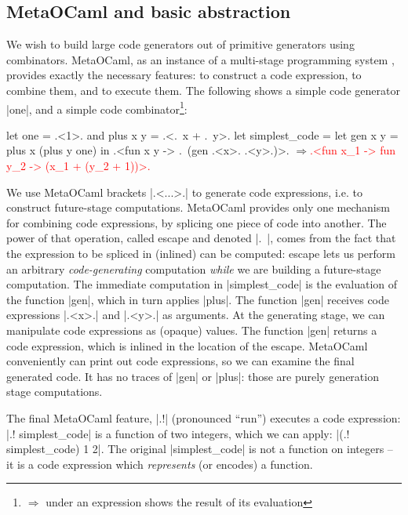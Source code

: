 \documentclass{elsart}
\newcommand{\evalresult}[1]{\ensuremath{\Longrightarrow}\textcolor{red}{#1}}
\begin{document}
\subsection{MetaOCaml and basic abstraction}\label{ssec:metaocaml}

We wish to build large code generators out of primitive generators using 
combinators. MetaOCaml, as an instance of a multi-stage
programming system \cite{TahaThesis}, provides exactly the necessary
features: to construct a code expression, to combine them, and to
execute them. The following shows a simple code generator |one|,
and a simple code combinator\footnote{%
$\Longrightarrow$ under an expression shows the result of its evaluation}:

\begin{code}[commandchars=\\\{\}]
let one = .<1>. and plus x y = .<.~x + .~y>.
let simplest_code = let gen x y = plus x (plus y one) in
  .<fun x y -> .~(gen .<x>. .<y>.)>.
\evalresult{.<fun x_1 -> fun y_2 -> (x_1 + (y_2 + 1))>.}
\end{code}

We use MetaOCaml brackets |.<...>.| to generate code expressions,
i.e. to construct future-stage computations. MetaOCaml provides only
one mechanism for combining code expressions, by splicing one
piece of code into another. The power of that operation, called escape and
denoted |.~|, comes from
the fact that the expression to be spliced in (inlined) can be
computed: escape lets us perform an arbitrary \emph{code-generating}
computation \emph{while} we are
building a future-stage computation. The immediate computation in
|simplest_code| is the evaluation of the function |gen|, which in turn
applies |plus|. The function |gen| receives code expressions |.<x>.|
and |.<y>.| as arguments. At the generating stage, we can manipulate
code expressions as (opaque) values. The function |gen| returns a code
expression, which is inlined in the location of the escape. MetaOCaml 
conveniently can
print out code expressions, so we can examine the final generated code. It
has no traces of |gen| or |plus|: those are purely generation stage
computations.

The final MetaOCaml feature, |.!| (pronounced ``run'') 
executes a code expression: |.! simplest_code| is a function of two
integers, which we can apply: |(.! simplest_code) 1 2|. The original
|simplest_code| is not a function on integers -- it is a code
expression which \emph{represents} (or encodes) a function.
\end{document}
